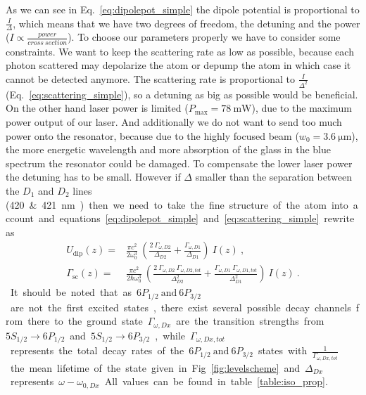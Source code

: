 As we can see in Eq.~\eqref{eq:dipolepot_simple} the dipole potential is proportional 
to \(\frac{I}{\Delta} \), which means that we have two degrees of freedom, the 
detuning and the power (\(I\propto\frac{power}{cross~section} \)). To choose our 
parameters properly we have to consider some constraints. We want to keep the 
scattering rate as low as possible, because each photon scattered may depolarize 
the atom or depump the atom in which case it cannot be detected
anymore. The scattering rate is proportional 
to \(\frac{I}{\Delta^2} \) (Eq.~\ref{eq:scattering_simple}), so a detuning as big 
as possible would be beneficial. On the other hand laser power is limited 
(\(P_{\max}=\SI{78}{\milli\watt} \)), due to the maximum power output of our laser.
And additionally we do not want to send too much power onto the resonator, because 
due to the highly focused beam (\(w_0 = \SI{3.6}{\micro\meter} \)), the more
energetic wavelength and more absorption of the glass in the blue spectrum the 
resonator could be damaged. To compensate the lower laser power the detuning has 
to be small. However if \(\Delta \) smaller than the separation between the 
\(D_1 \) and \(D_2 \) lines (\SI{420}~\& \SI{421}{\nano\meter}) then we need to 
take the fine structure of the atom into account and equations~\eqref{eq:dipolepot_simple} 
and~\eqref{eq:scattering_simple} rewrite as~\cite{grimm} 
%
\begin{align}\label{eq:dipolpotenial}
    U_\mathrm{dip}(z) =& \frac{\pi c^2}{2\omega_0^3}~\left( 
        \frac{2~\Gamma_{\omega,D2}}{\Delta_{D2}} + 
        \frac{\Gamma_{\omega,D1}}{\Delta_{D1}} \right)~I(z)~, \\
    \Gamma_{\mathrm{sc}}(z) =& \frac{\pi c^2}{2\hbar\omega_0^3}~\left( 
        \frac{2~\Gamma_{\omega,D2}~\Gamma_{\omega,D2,tot} }{\Delta_{D2}^2 } + 
        \frac{\Gamma_{\omega,D1}~\Gamma_{\omega,D1,tot} }{\Delta_{D1}^2 } \right)~I(z)~.
\end{align}
%

It should be noted that as \(6P_{1/2}~\text{and}~6P_{3/2} \) are not the first
excited states, there exist several possible decay channels from there to the
ground state. \(\Gamma_{\omega,Dx} \) are the transition strengths from 
\(5S_{1/2} \rightarrow 6P_{1/2} \) and \(5S_{1/2} \rightarrow 6P_{3/2} \), while
\(\Gamma_{\omega,Dx,tot} \) represents the total decay rates of the 
\(6P_{1/2}~\text{and}~6P_{3/2} \) states with \(\frac{1}{\Gamma_{\omega,Dx,tot}} \) 
the mean lifetime of the state given in Fig.~\ref{fig:levelscheme} and \(\Delta_{Dx} \) 
represents \(\omega - \omega_{0,Dx} \). All values can be found in 
table~\ref{table:iso_prop}.


